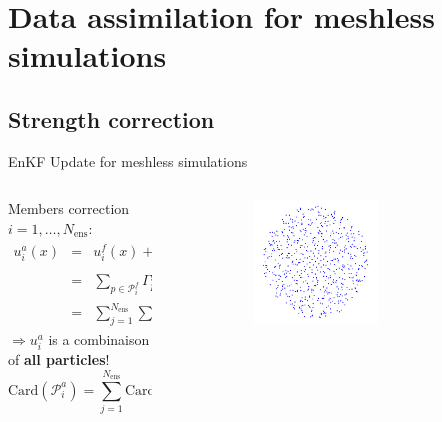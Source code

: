 \documentclass[aspectratio=169]{beamer} %
\begin{document}
\section{Data assimilation for meshless simulations}
\subsection{Strength correction}
\begin{frame}{EnKF Update for meshless simulations}

    \begin{columns}[t]
        \begin{column}{0.7\textwidth}
            Members correction $i = 1, \dots, N_{\text{ens}}$: \\
            \vspace{-0.50cm}
            \begin{eqnarray*}
                u_i^a(x) &=& u^f_i(x) + \sum_{j=1}^{N_{\text{ens}}} F_{ij}~u^f_j(x), \\
                &=& \sum_{p \in \mathcal{P}^f_i} \Gamma^f_p \phi_h(x - x_p) + \sum_{j=1}^{N_{\text{ens}}} F_{ij} \sum_{{p'} \in \mathcal{P}_j^f} \Gamma^f_{p'} \phi_h(x - x_{p'}), \\
                &=& \sum_{j=1}^{N_{\text{ens}}} \sum_{ p \in \mathcal{P}^f_i} \Gamma^a_p \phi_h (x - x_p)
            \end{eqnarray*}
            \vspace{-0.10cm}
            $\Rightarrow u_i^a$ is a combinaison of \textbf{all particles}! \\
            \vspace{-0.10cm}
            \begin{equation*}\text{Card}(\mathcal P^a_i) = \sum_{j=1}^{N_{\text{ens}}}\text{Card}(\mathcal P^f_j)
            \end{equation*}
        \end{column}
        \begin{column}{0.3\textwidth}
            \vspace{-1cm}
            \begin{figure}
                \centering
                \begin{subfigure}{\textwidth}
                    \centering
                    \includegraphics[width=0.7\textwidth]{images/memb_particles.pdf}

\end{subfigure}
\end{figure}
\end{column}
\end{columns}
\end{frame}
\end{document}
